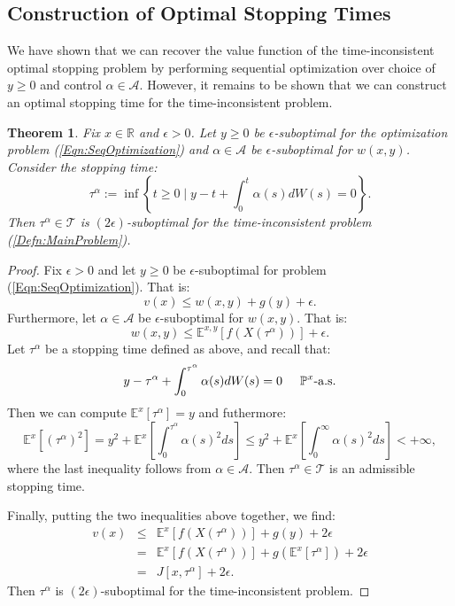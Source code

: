\documentclass[11pt]{article}
\newtheorem{thm}{Theorem}
\begin{document}
\subsection{Construction of Optimal Stopping Times}\label{Subsection:Construction}

We have shown that we can recover the value function of the time-inconsistent optimal stopping problem by performing sequential optimization over choice of $y\geq 0$ and control $\alpha\in\mathcal{A}$. However, it remains to be shown that we can construct an optimal stopping time for the time-inconsistent problem.

\begin{thm}\label{Thm:StoppingTimeConstruction}
Fix $x\in\mathbb{R}$ and $\epsilon > 0$. Let $y\geq 0$ be $\epsilon$-suboptimal for the optimization problem (\ref{Eqn:SeqOptimization}) and $\alpha\in\mathcal{A}$ be $\epsilon$-suboptimal for $w(x,y)$. Consider the stopping time:
\[\tau^\alpha := \inf\left\{t\geq 0\mid y-t+\int_0^t\alpha(s)dW(s) = 0\right\}.\]
Then $\tau^\alpha\in\mathcal{T}$ is $(2\epsilon)$-suboptimal for the time-inconsistent problem (\ref{Defn:MainProblem}).\end{thm}
\begin{proof}
Fix $\epsilon >0$ and let $y\geq 0$ be $\epsilon$-suboptimal for problem (\ref{Eqn:SeqOptimization}). That is:
\[v(x)\leq w(x,y)+g(y)+\epsilon.\]
Furthermore, let $\alpha\in\mathcal{A}$ be $\epsilon$-suboptimal for $w(x,y)$. That is:
\[w(x,y)\leq\mathbb{E}^{x,y}\left[f(X(\tau^\alpha))\right]+\epsilon.\]
Let $\tau^\alpha$ be a stopping time defined as above, and recall that:
\[y - \tau^\alpha +\int_0^{\tau^\alpha}\alpha(s)dW(s) = 0\hspace*{0.5cm}\mathbb{P}^x\text{-a.s.}\]
Then we can compute $\mathbb{E}^x\left[\tau^\alpha\right] = y$ and futhermore:
\[\mathbb{E}^x\left[(\tau^\alpha)^2\right] = y^2 + \mathbb{E}^x\left[\int_0^{\tau^\alpha}\alpha(s)^2 ds\right]\leq y^2+\mathbb{E}^x\left[\int_0^\infty\alpha(s)^2 ds\right] < +\infty,\]
where the last inequality follows from $\alpha\in\mathcal{A}$. Then $\tau^\alpha\in\mathcal{T}$ is an admissible stopping time.

Finally, putting the two inequalities above together, we find:
\begin{eqnarray}
v(x)& \leq & \mathbb{E}^x\left[f(X(\tau^\alpha))\right]+g(y)+2\epsilon \nonumber\\
& =&  \mathbb{E}^x\left[f(X(\tau^\alpha))\right]+g(\mathbb{E}^x\left[\tau^\alpha\right]) + 2\epsilon\nonumber\\
& = & J\left[x,\tau^\alpha\right] + 2\epsilon.\nonumber
\end{eqnarray}
Then $\tau^\alpha$ is $\left(2\epsilon\right)$-suboptimal for the time-inconsistent problem.
\end{proof}
\end{document}

